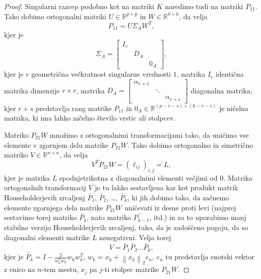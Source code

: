 \documentclass[mat1]{article}
\newcommand{\norm}[1]{\left\lVert#1\right\rVert}
\begin{document}
\begin{proof}
Singularni razcep podobno kot na matriki $K$ naredimo tudi na matriki $P_{11}$. Tako dobimo ortogonalni matriki $U \in \mathbb{R}^{p \times p}$ in $W \in \mathbb{R}^{k \times k}$, da velja $$ P_{11} = U \Sigma_A W^T \text{,}$$ kjer je $$\Sigma_A = 
\begin{bmatrix} 
I_r &  & \\
 & D_A & \\
 & & 0_A  
\end{bmatrix} \text{,}$$ kjer je $r$ geometrična večkratnost singularne vrednosti $1$, matrika $I_r$ identična matrika dimenzije $r \times r$, matrika $D_A =
\begin{bmatrix}
\alpha_{r+1} & & \\
 & \ddots & \\
 & & \alpha_{r+s}
\end{bmatrix}$ diagonalna matrika, kjer $r+s$ predstavlja rang matrike $P_{11}$ in $0_A \in \mathbb{R}^{(p-r-s) \times (k-r-s)}$ je ničelna matrika, ki ima lahko ničelno število vrstic ali stolpcev.


Matriko $P_{21} W$ množimo z ortogonalnimi transformacijami tako, da uničimo vse elemente v zgornjem delu matrike $P_{21} W$. Tako dobimo ortogonalno in simetrično matriko $V \in \mathbb{R}^{n \times n}$, da velja 
$$ V^T P_{21} W = (\ell_{ij})_{i, j} = L 
\text{,}$$
kjer je matrika $L$ spodnjetrikotna z diagonalnimi elementi večjimi od $0$. Matrika ortogonalnih transformacij $V$ je tu lahko sestavljena kar kot produkt matrik Householderjevih zrcaljenj $\tilde{P_1}$, $\tilde{P_2}$, \ldots, $\tilde{P_k}$, ki jih dobimo tako, da začnemo elemente zgornjega dela matrike $P_{21} W$ uničevati iz desne proti levi (najprej sestavimo torej matriko $\tilde{P_k}$, nato matriko $\tilde{P_{k-1}}$, itd.) in za to uporabimo manj stabilno verzijo Householderjevih zrcaljenj, tako, da je zadoščeno pogoju, da so diagonalni elementi matrike $L$ nenegativni.
Velja torej $$V = \tilde{P_1} \tilde{P_2} \dots \tilde{P_k} \text{,}$$
kjer je $\tilde{P_k} = I - \frac{2}{w_k^T w_k} w_k w_k^T$, $w_k = x_k + \norm{x_k}_2 e_n$, $e_n$ tu predstavlja enotski vektor z enico na $n$-tem mestu, $x_j$ pa $j$-ti stolpec matrike $P_{21} W$.



\end{proof}
\end{document}
